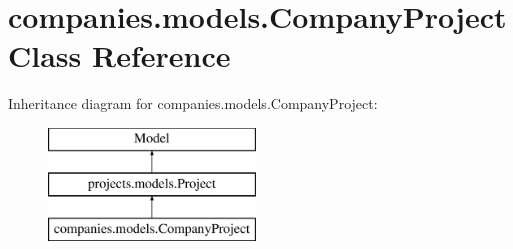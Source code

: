 \hypertarget{classcompanies_1_1models_1_1_company_project}{\section{companies.\-models.\-Company\-Project Class Reference}
\label{classcompanies_1_1models_1_1_company_project}
}
Inheritance diagram for companies.\-models.\-Company\-Project\-:\begin{figure}[H]
\begin{center}
\leavevmode
\includegraphics[height=3.000000cm]{classcompanies_1_1models_1_1_company_project}
\end{center}
\end{figure}
